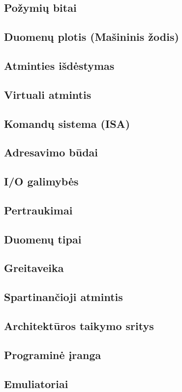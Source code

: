 \documentclass{article}
\begin{document}
\subsection{Požymių bitai}
\subsection{Duomenų plotis (Mašininis žodis)}
\subsection{Atminties išdėstymas}
\subsection{Virtuali atmintis}
\subsection{Komandų sistema (ISA)}
\subsection{Adresavimo būdai}
\subsection{I/O galimybės}
\subsection{Pertraukimai}
\subsection{Duomenų tipai}
\subsection{Greitaveika}
\subsection{Spartinančioji atmintis}
\subsection{Architektūros taikymo sritys}
\subsection{Programinė įranga}
\subsection{Emuliatoriai}
\end{document}
